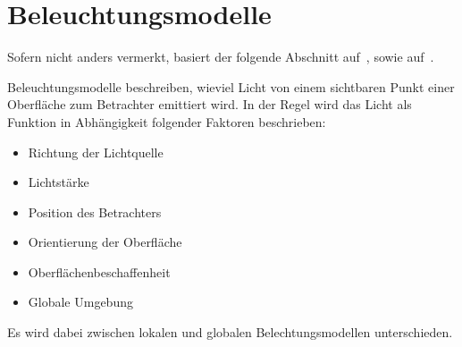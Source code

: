 
\section{Beleuchtungsmodelle}
\label{sec:illumination_models}

Sofern nicht anders vermerkt, basiert der folgende Abschnitt
auf~\cite[S. 343]{whitted_improved_1980}, sowie
auf~\cite{hughes_computer_2013}.

Beleuchtungsmodelle beschreiben, wieviel Licht von einem sichtbaren
Punkt einer Oberfläche zum Betrachter emittiert wird. In der Regel wird
das Licht als Funktion in Abhängigkeit folgender Faktoren beschrieben:

\begin{itemize}
    \item Richtung der Lichtquelle
    \item Lichtstärke
    \item Position des Betrachters
    \item Orientierung der Oberfläche
    \item Oberflächenbeschaffenheit
    \item Globale Umgebung
\end{itemize}

Es wird dabei zwischen lokalen und globalen Belechtungsmodellen unterschieden.




